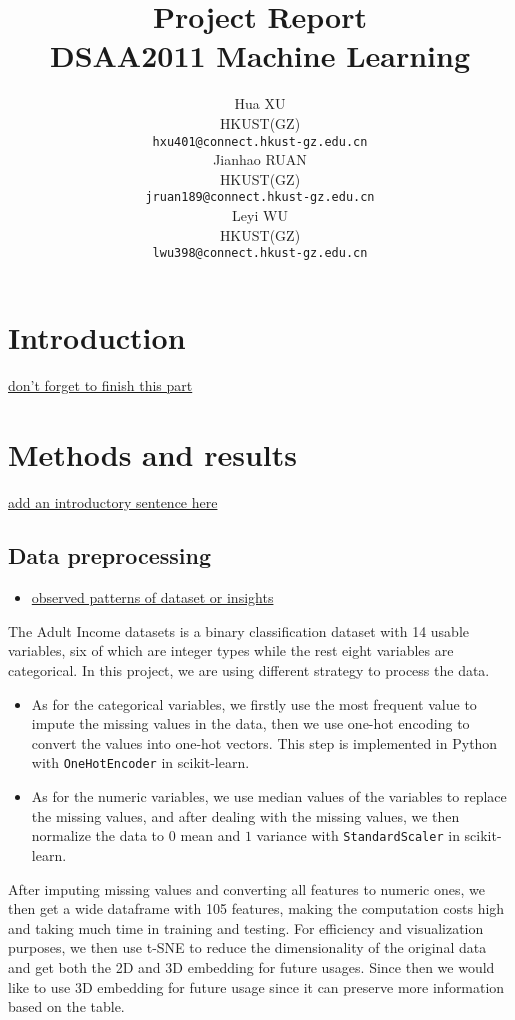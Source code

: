 \documentclass{article}
\title{Project Report \large \\ DSAA2011 Machine Learning}
\author{%
   Hua XU \\
   HKUST(GZ) \\
   \texttt{hxu401@connect.hkust-gz.edu.cn} \\
   \And
   Jianhao RUAN \\
   HKUST(GZ) \\
   \texttt{jruan189@connect.hkust-gz.edu.cn} \\
   \And
   Leyi WU \\
   HKUST(GZ) \\
   \texttt{lwu398@connect.hkust-gz.edu.cn} \\
}
\begin{document}
\maketitle

\section{Introduction}

\underline{don't forget to finish this part}


\section{Methods and results}

\underline{add an introductory sentence here}

\subsection{Data preprocessing}

\begin{itemize}
    \item \underline{observed patterns of dataset or insights}
\end{itemize}

The Adult Income datasets is a binary classification dataset with 14 usable variables, six of which are integer types while the rest eight variables are categorical. In this project, we are using different strategy to process the data.

\begin{itemize}
    \item As for the categorical variables, we firstly use the most frequent value to impute the missing values in the data, then we use one-hot encoding to convert the values into one-hot vectors. This step is implemented in Python with \texttt{OneHotEncoder} in scikit-learn.
    \item As for the numeric variables, we use median values of the variables to replace the missing values, and after dealing with the missing values, we then normalize the data to $0$ mean and $1$ variance with \texttt{StandardScaler} in scikit-learn.
\end{itemize}

After imputing missing values and converting all features to numeric ones, we then get a wide dataframe with 105 features, making the computation costs high and taking much time in training and testing. For efficiency and visualization purposes, we then use t-SNE to reduce the dimensionality of the original data and get both the 2D and 3D embedding for future usages. Since then we would like to use 3D embedding for future usage since it can preserve more information based on the table.
\end{document}
